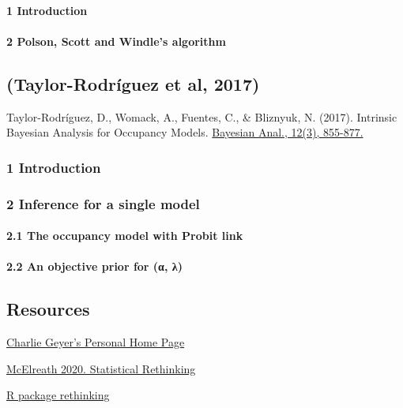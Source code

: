 \documentclass[
]{article}
\begin{document}
\hypertarget{introduction-3}{%
\paragraph{1 Introduction}\label{introduction-3}}

\hypertarget{polson-scott-and-windles-algorithm}{%
\paragraph{2 Polson, Scott and Windle's
algorithm}\label{polson-scott-and-windles-algorithm}}

\hypertarget{taylor-rodruxedguez-et-al-2017}{%
\subsection{(Taylor-Rodríguez et al,
2017)}\label{taylor-rodruxedguez-et-al-2017}}

Taylor-Rodríguez, D., Womack, A., Fuentes, C., \& Bliznyuk, N. (2017).
Intrinsic Bayesian Analysis for Occupancy Models.
\href{https://projecteuclid.org/euclid.ba/1473431536}{Bayesian Anal.,
12(3), 855-877.}

\hypertarget{introduction-4}{%
\subsubsection{1 Introduction}\label{introduction-4}}

\hypertarget{inference-for-a-single-model}{%
\subsubsection{2 Inference for a single
model}\label{inference-for-a-single-model}}

\hypertarget{the-occupancy-model-with-probit-link}{%
\paragraph{2.1 The occupancy model with Probit
link}\label{the-occupancy-model-with-probit-link}}

\hypertarget{an-objective-prior-for-ux3b1-ux3bb}{%
\paragraph{2.2 An objective prior for (α,
λ)}\label{an-objective-prior-for-ux3b1-ux3bb}}

\hypertarget{resources}{%
\subsection{Resources}\label{resources}}

\href{http://users.stat.umn.edu/~geyer/}{Charlie Geyer's Personal Home
Page}

\href{https://xcelab.net/rm/statistical-rethinking/}{McElreath 2020.
Statistical Rethinking}

\href{https://github.com/rmcelreath/rethinking}{R package rethinking}
\end{document}
